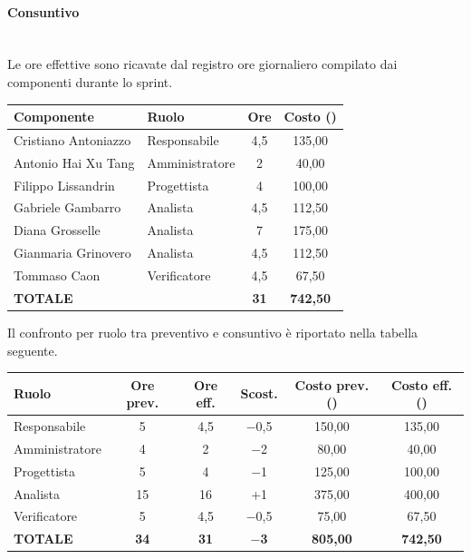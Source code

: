 \paragraph{Consuntivo}~\\[0.15cm]
Le ore effettive sono ricavate dal registro ore giornaliero compilato dai componenti durante lo sprint.

\vspace{2mm}
\renewcommand{\arraystretch}{1.3}
\noindent
\begin{tabularx}{\textwidth}{|X l c c|}
\hline
\textbf{Componente} & \textbf{Ruolo} & \textbf{Ore} & \textbf{Costo (\texteuro{})} \\
\hline
Cristiano Antoniazzo & Responsabile & 4,5 & 135,00 \\
Antonio Hai Xu Tang & Amministratore & 2 & 40,00 \\
Filippo Lissandrin & Progettista & 4 & 100,00 \\
Gabriele Gambarro & Analista & 4,5 & 112,50 \\
Diana Grosselle & Analista & 7 & 175,00 \\
Gianmaria Grinovero & Analista & 4,5 & 112,50 \\
Tommaso Caon & Verificatore & 4,5 & 67,50 \\
\hline
\textbf{TOTALE} & & \textbf{31} & \textbf{742,50} \\
\hline
\end{tabularx}

\vspace{3mm}
\noindent
Il confronto per ruolo tra preventivo e consuntivo è riportato nella tabella seguente.

\vspace{2mm}
\renewcommand{\arraystretch}{1.3}
\noindent
\begin{tabularx}{\textwidth}{|X c c c c c|}
\hline
\textbf{Ruolo} & \textbf{Ore prev.} & \textbf{Ore eff.} & \textbf{Scost.} & \textbf{Costo prev. (\texteuro{})} & \textbf{Costo eff. (\texteuro{})} \\
\hline
Responsabile & 5 & 4,5 & $-$0,5 & 150,00 & 135,00 \\
Amministratore & 4 & 2 & $-$2 & 80,00 & 40,00 \\
Progettista & 5 & 4 & $-$1 & 125,00 & 100,00 \\
Analista & 15 & 16 & +1 & 375,00 & 400,00 \\
Verificatore & 5 & 4,5 & $-$0,5 & 75,00 & 67,50 \\
\hline
\textbf{TOTALE} & \textbf{34} & \textbf{31} & \textbf{$-$3} & \textbf{805,00} & \textbf{742,50} \\
\hline
\end{tabularx}

